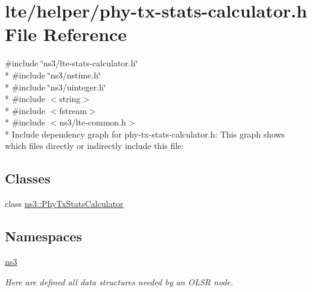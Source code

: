 \hypertarget{phy-tx-stats-calculator_8h}{}\section{lte/helper/phy-\/tx-\/stats-\/calculator.h File Reference}
\label{phy-tx-stats-calculator_8h}
{\ttfamily \#include \char`\"{}ns3/lte-\/stats-\/calculator.\+h\char`\"{}}\\*
{\ttfamily \#include \char`\"{}ns3/nstime.\+h\char`\"{}}\\*
{\ttfamily \#include \char`\"{}ns3/uinteger.\+h\char`\"{}}\\*
{\ttfamily \#include $<$string$>$}\\*
{\ttfamily \#include $<$fstream$>$}\\*
{\ttfamily \#include $<$ns3/lte-\/common.\+h$>$}\\*
Include dependency graph for phy-\/tx-\/stats-\/calculator.h\+:
This graph shows which files directly or indirectly include this file\+:
\subsection*{Classes}
\begin{DoxyCompactItemize}
\item 
class \hyperlink{classns3_1_1PhyTxStatsCalculator}{ns3\+::\+Phy\+Tx\+Stats\+Calculator}
\end{DoxyCompactItemize}
\subsection*{Namespaces}
\begin{DoxyCompactItemize}
\item 
 \hyperlink{namespacens3}{ns3}
\begin{DoxyCompactList}\small\item\em Here are defined all data structures needed by an O\+L\+SR node. \end{DoxyCompactList}\end{DoxyCompactItemize}
